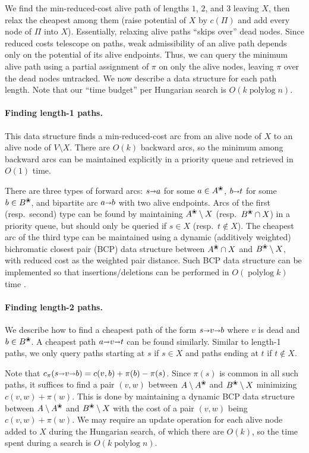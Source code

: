 \documentclass[11pt,twoside]{article}
\def\polylog{\mathop{\mathrm{polylog}}}
\def\arcto{\mathord\shortrightarrow}
\def\arc#1#2{#1\arcto#2}
\def\alive#1{{#1}^\text{\ding{96}}}
\def\dead#1{{#1} \setminus \alive{#1}}
\theoremstyle{plain}
\numberwithin{figure}{section}
\renewcommand{\subparagraph}{\paragraph}
\begin{document}
We find the min-reduced-cost alive path of lengths $1$, $2$, and $3$
leaving $X$, then relax the cheapest among them (raise potential of $X$ by $c(\Pi)$ and
add every node of $\Pi$ into $X$).
Essentially, relaxing alive paths ``skips over'' dead nodes.
Since reduced costs telescope on paths, weak admissibility of an alive path
depends only on the potential of its alive endpoints.
Thus, we can query the minimum alive path using a partial assignment
of $\pi$ on only the alive nodes, leaving $\pi$ over the dead nodes untracked.
%
We now describe a data structure for each path length.
Note that our ``time budget'' per Hungarian search is $O(k\polylog n)$.

\subparagraph{Finding length-1 paths.}
This data structure finds a min-reduced-cost arc from an alive node of
$X$ to an alive node of $V \setminus X$.
There are $O(k)$ backward arcs, so the minimum among backward arcs can be
maintained explicitly in a priority queue and retrieved in $O(1)$ time.

There are three types of forward arcs: $\arc sa$ for some $a \in \alive{A}$,
$\arc bt$ for some $b \in \alive{B}$, and bipartite arc $\arc ab$ with two
alive endpoints.
Arcs of the first (resp.\ second) type can be found by maintaining
$\alive{A} \setminus X$ (resp.\ $\alive{B} \cap X$) in a priority queue,
but should only be queried if $s \in X$ (resp.\ $t \not\in X$).
%
The cheapest arc of the third type can be maintained using a dynamic
(additively weighted) bichromatic closest pair (BCP) data structure between
$\alive{A} \cap X$ and $\alive{B} \setminus X$,
with reduced cost as the weighted pair distance.
Such BCP data structure can be implemented so that insertions/deletions can be performed
in $O(\polylog k)$ time \cite{KMRSS17}.

\subparagraph{Finding length-2 paths.}
We describe how to find a cheapest path of the form $s \arcto v \arcto b$ where
$v$ is dead and $b \in \alive{B}$.
A cheapest path $a \arcto v \arcto t$ can be found similarly.
Similar to length-1 paths, we only query paths starting at $s$ if $s \in X$
and paths ending at $t$ if $t \not\in X$.

Note that $c_\pi(s \arcto v \arcto b) = c(v, b) + \pi(b) - \pi(s)$.
Since $\pi(s)$ is common in all such paths, it suffices to find a pair $(v,w)$ between
$\dead{A}$ and $\alive{B} \setminus X$ minimizing $c(v, w) + \pi(w)$.
This is done by maintaining a dynamic BCP data structure between
$\dead{A}$ and $\alive{B} \setminus X$ with
the cost of a pair $(v, w)$ being $c(v, w) + \pi(w)$.
We may require an update operation for each alive node added to $X$ during the
Hungarian search, of which there are $O(k)$, so the time spent during a search
is $O(k\polylog n)$.
\end{document}
